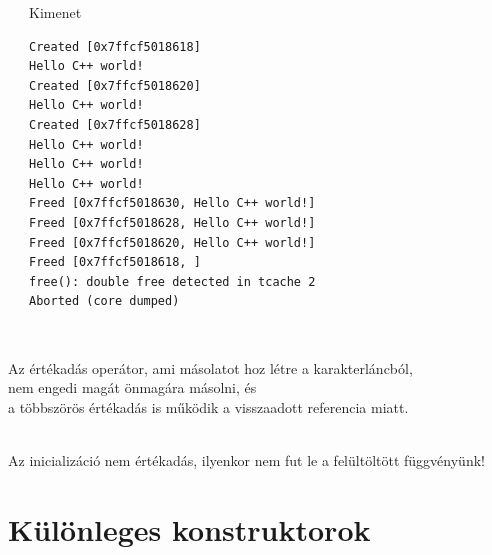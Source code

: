 \documentclass[usenames,dvipsnames,aspectratio=169]{beamer}
\begin{document}
\begin{frame}[fragile]
    \begin{columns}[T]
            \begin{exampleblock}{}
                \vspace{-.2cm}
                
                \vspace{-.2cm}
            \end{exampleblock}
            \begin{block}{Kimenet}
                \vspace{-.4cm}
                \footnotesize
                \begin{verbatim}
Created [0x7ffcf5018618]
Hello C++ world!
Created [0x7ffcf5018620]
Hello C++ world!
Created [0x7ffcf5018628]
Hello C++ world!
Hello C++ world!
Hello C++ world!
Freed [0x7ffcf5018630, Hello C++ world!]
Freed [0x7ffcf5018628, Hello C++ world!]
Freed [0x7ffcf5018620, Hello C++ world!]
Freed [0x7ffcf5018618, ]
free(): double free detected in tcache 2
Aborted (core dumped)               
\end{verbatim}             
                \vspace{-.4cm}
            \end{block}
    \end{columns}
\end{frame}

\begin{frame}
    \begin{description}[m]
        \item[Ami jól működik:] \hfill \\ Az értékadás operátor, ami másolatot hoz létre a karakterláncból, \\nem engedi magát önmagára másolni, és \\a többszörös értékadás is működik a visszaadott referencia miatt.
        \item[Ami hibás:] \hfill \\ Az inicializáció nem értékadás, ilyenkor nem fut le a felültöltött függvényünk!
    \end{description}
\end{frame}

\section{Különleges konstruktorok}
\end{document}
